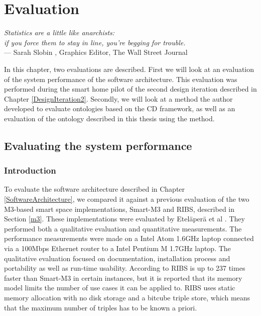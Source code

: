 \chapter{Evaluation}
\label{Evaluation}

\begin{flushright}{\slshape    
Statistics are a little like anarchists: \\
if you force them to stay in line, you're begging for trouble.} \\ \medskip
    --- Sarah Slobin \cite{Slobin2010}, Graphics Editor, The Wall Street Journal
\end{flushright}


In this chapter, two evaluations are described. First we will look at an evaluation of the system performance of the software architecture. This evaluation was performed during the smart home pilot of the second design iteration described in Chapter \ref{DesignIteration2}. Secondly, we will look at a method the author developed to evaluate ontologies based on the \ac{CD} framework, as well as an evaluation of the ontology described in this thesis using the method.

\section{Evaluating the system performance}
\label{performance}
\subsection{Introduction}

To evaluate the software architecture described in Chapter \ref{SoftwareArchitecture}, we compared it against a previous evaluation of the two M3-based smart space implementations, Smart-M3 and \ac{RIBS}, described in Section \ref{m3}. These implementations were evaluated by Etel\"aper\"a et al \cite{Etelapera2011}. They performed both a qualitative evaluation and quantitative measurements. The performance measurements were made on a Intel Atom 1.6GHz laptop connected via a 100Mbps Ethernet router to a Intel Pentium M 1.7GHz laptop. The qualitative evaluation focused on documentation, installation process and portability as well as run-time usability. According to \cite{Etelapera2011} \ac{RIBS} is up to 237 times faster than Smart-M3 in certain instances, but it is reported that its memory model limits the number of use cases it can be applied to. \ac{RIBS} uses static memory allocation with no disk storage and a bitcube triple store, which means that the maximum number of triples has to be known a priori.

